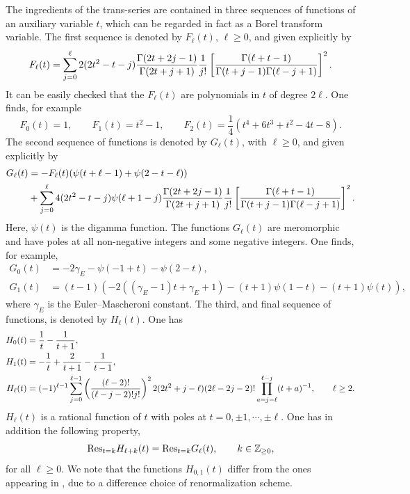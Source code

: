 \documentclass[a4paper,11pt]{article}
\theoremstyle{definition}
\def\IZ{{\mathbb Z}}
\newcommand{\be}{\begin{equation}}
\newcommand{\ee}{\end{equation}}
\newcommand{\ba}{\begin{aligned}}
\newcommand{\ea}{\end{aligned}}
\begin{document}
The ingredients of the trans-series are contained in three sequences of %
functions of an auxiliary variable $t$, 
which can be regarded in fact as a Borel transform variable. The first sequence is denoted by $F_\ell(t)$, $\ell \ge 0$, 
and given explicitly by 
%
\be
F_\ell(t)= \sum_{j=0}^\ell 2(2t ^2 -t-j){\Gamma(2t+2j-1) \over \Gamma(2t+j+1)}{1 \over j!}\left[ {\Gamma(\ell+t-1) \over \Gamma(t+j-1) \Gamma(\ell-j+1)} \right]^2. 
\ee
%
It can be easily checked that the $F_\ell(t)$ are polynomials in $t$ of degree $2\ell$. One finds, for example 
%
\be
F_0(t)=1, \qquad F_1 (t)= t^2-1, \qquad F_2(t)= \frac{1}{4} \left(t^4+6 t^3+t^2-4 t-8\right). 
\ee
%
The second sequence of functions is denoted by $G_\ell(t)$, with $\ell\ge 0$, and given explicitly by 
%
\be
\ba
G_\ell(t)&=-F_\ell(t) (\psi(t+\ell-1)+\psi(2-t-\ell))\\
&+ \sum_{j=0}^\ell 4(2t ^2 -t-j)\psi(\ell+1-j) {\Gamma(2t+2j-1) \over \Gamma(2t+j+1)}{1 \over j!}\left[ {\Gamma(\ell+t-1) \over \Gamma(t+j-1) \Gamma(\ell-j+1)} \right]^2.
\ea
\ee
%
Here, $\psi(t)$ is the digamma function. The functions $G_\ell(t)$ are meromorphic and have poles at all non-negative integers and some negative integers. One finds, for example, 
%
\be
\ba
G_0(t)&= -2 \gamma_E - \psi(-1+t) -\psi(2-t),\\
 G_1(t)&=(t-1) \left(-2 ((\gamma_E -1) t+\gamma_E +1)-(t+1) \psi (1-t)-(t+1) \psi (t) \right), 
 \ea
\ee
%
where $\gamma_E$ is the Euler--Mascheroni constant. The third, and final sequence of functions, is 
denoted by $H_\ell(t)$. One has 
%
\be
\ba
H_0(t)&= {1\over t} -{1 \over t+1}, \\
H_1(t)&=-\frac{1}{t}+\frac{2}{t+1}-\frac{1}{t-1}, \\
H_\ell(t)&= (-1)^{\ell-1} \sum_{j=0}^{\ell-1}\left(  {(\ell-2)! \over (\ell-j-2)! j!} \right)^2 2(2 t^2+j-\ell) (2\ell-2j-2)! \prod_{a=j-\ell}^{\ell-j} (t+a)^{-1}, \qquad \ell \ge 2. 
\ea
\ee
%
$H_\ell(t)$ is a rational function of $t$ with poles at $t=0, \pm 1, \cdots, \pm \ell$. One has in addition the following 
property,
%
\be
\label{resHresG}
{\rm Res}_{t=k} H_{\ell+k}(t)= {\rm Res}_{t=k} G_{\ell}(t), \qquad k \in \IZ_{\ge 0},  
\ee
%
for all $\ell\ge 0$. We note that the functions $H_{0,1}(t)$ differ from the ones appearing in \cite{beneke-braun}, due to a difference 
choice of renormalization scheme. 
\end{document}
